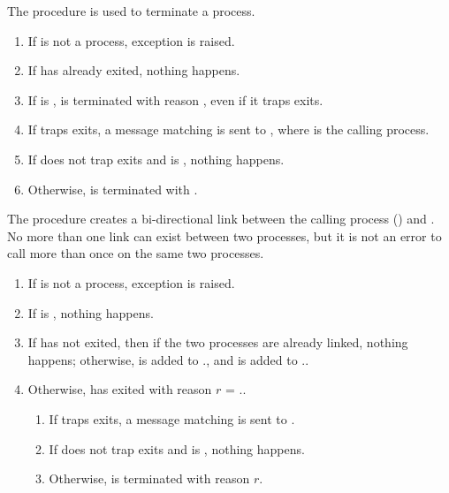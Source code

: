 The  procedure is used to terminate a process.
\begin{enumerate}
\item If  is not a process, exception  is raised.
\item If  has already exited, nothing happens.
\item If  is ,  is terminated
  with reason , even if it traps exits.
\item If  traps exits, a message matching  is sent to , where  is the
  calling process.
\item If  does not trap exits and  is
  , nothing happens.
\item Otherwise,  is terminated with .
\end{enumerate}

\begin{procedure}
\end{procedure}
\returns{} 

The  procedure creates a bi-directional link between the
calling process () and . No more than one link
can exist between two processes, but it is not an error to call
 more than once on the same two processes.

\begin{enumerate}
\item If  is not a process, exception  is raised.
\item If  is , nothing happens.
\item If  has not exited, then if the two processes are
  already linked, nothing happens; otherwise,  is added to
  ., and  is added to
  ..
\item Otherwise,  has exited with reason $r$ =
  ..
  \begin{enumerate}
  \item If  traps exits, a message matching 
    is sent to .
  \item If  does not trap exits and  is ,
    nothing happens.
  \item Otherwise,  is terminated with reason $r$.
  \end{enumerate}
\end{enumerate}

